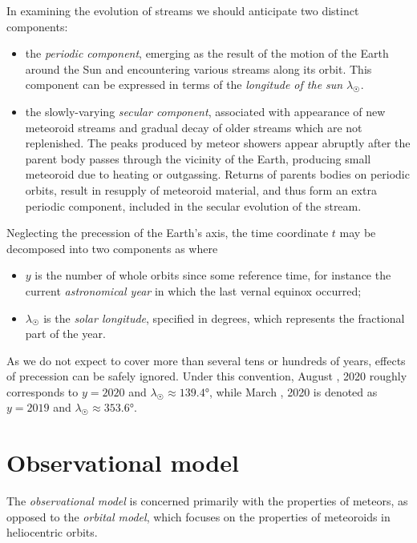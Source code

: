         In examining the evolution of streams we should anticipate two distinct components:
        \begin{itemize}
            \item the \emph{periodic component}, emerging as the result of the motion of the Earth
                around the Sun and encountering various streams along its orbit.
                This component can be expressed in terms of the \emph{longitude of the sun} $\lambda_\Sun$.

            \item the slowly-varying \emph{secular component}, associated with appearance of new meteoroid
                streams and gradual decay of older streams which are not replenished.
                The peaks produced by meteor showers appear abruptly after the parent body passes through the vicinity of the Earth,
                producing small meteoroid due to heating or outgassing.
                Returns of parents bodies on periodic orbits, result in resupply of meteoroid material,
                and thus form an extra periodic component, included in the secular evolution of the stream.
        \end{itemize}

        Neglecting the precession of the Earth's axis, the time coordinate $t$ may be decomposed into two components as
        where
        \begin{itemize}
            \item $y$ is the number of whole orbits since some reference time, for instance
                the current \emph{astronomical year} in which the last vernal equinox occurred;
            \item $\lambda_\Sun$ is the \emph{solar longitude}, specified in degrees, which represents the fractional part of the year.
        \end{itemize}

        As we do not expect to cover more than several tens or hundreds of years, effects of precession can be safely ignored.
        Under this convention, August , 2020 roughly corresponds to $y = 2020$ and $\lambda_\Sun \approx \ang{139.4}$,
        while March , 2020 is denoted as $y = 2019$ and $\lambda_\Sun \approx \ang{353.6}$.


\section{Observational model} \label{m}
    The \emph{observational model} is concerned primarily with the properties of meteors,
    as opposed to the \emph{orbital model}, which focuses on the properties of meteoroids in heliocentric orbits.


